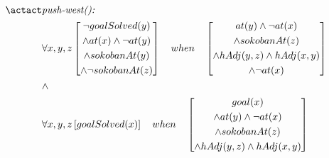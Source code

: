 \documentclass[../Master.tex]{subfiles}
\begin{document}
\begin{align*}
    \actact & \textit{push-west(): } & \\
    & \forall x, y, z
    \left[ 
        \begin{gathered}
            \neg goalSolved(y) \\
            \land at(x) \land \neg at (y) \\
            \land sokobanAt(y) \\
            \land \neg sokobanAt(z) 
        \end{gathered}
    \right]
    \quad when \quad
    \left[
        \begin{gathered}
            at(y) \land \neg at(x) \\
            \land sokobanAt(z) \\ 
            \land hAdj (y,z) \land hAdj (x,y) \\
            \land \neg at(x)
        \end{gathered}
    \right] \\
    & \land \\
    & \forall x, y, z
    \left[
        goalSolved(x)
    \right]
    \quad when \quad
    \left[
        \begin{gathered}
            goal(x) \\
            \land at(y) \land \neg at(x) \\ 
            \land sokobanAt(z) \\ 
            \land hAdj (y,z) \land hAdj (x,y) \\
        \end{gathered}
    \right]
\end{align*}
\end{document}
